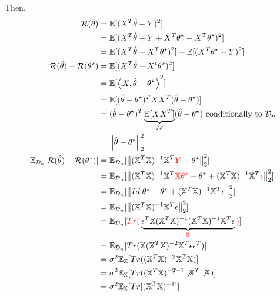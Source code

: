 Then, \begin{align*}
    \mathcal{R}(\hat{\theta }) 
        &= \mathbb{E}[(X^T \hat{\theta } - Y)^2] \\
        &= \mathbb{E}[(X^T \hat{\theta } - Y + X^T \theta ^\star - X^T \theta ^\star )^2] \\
        &= \mathbb{E}[(X^T \hat{\theta } - X^T \theta ^\star )^2] + \mathbb{E}[ (X^T \theta ^\star - Y)^2] \\
    \mathcal{R}(\hat{\theta }) - \mathcal{R}(\theta ^\star ) 
        &= \mathbb{E}[(X^T \hat{\theta } - X^t \theta ^\star )^2] \\
        &= \mathbb{E}[\left\langle X, \hat{\theta } - \theta ^\star  \right\rangle ^2 ] \\
        &= \mathbb{E}[(\hat{\theta } - \theta ^\star )^T X X^T (\hat{\theta } - \theta ^\star )] \\
        &= (\hat{\theta } - \theta ^\star )^T \underbrace{\mathbb{E}[X X^T]}_{Id}(\hat{\theta } - \theta ^\star ) \text{ conditionally to } \mathcal{D}_n \\
        &= \left\| \hat{\theta } - \theta ^\star  \right\| _2 ^2 \\
    \mathbb{E}_{\mathcal{D}_n} [ \mathcal{R}(\hat{\theta }) - \mathcal{R}(\theta ^\star )] 
        &= \mathbb{E}_{\mathcal{D}_n} [ \left\| (\mathbb{X} ^T \mathbb{X})^{-1} \mathbb{X} ^T \textcolor{red}{Y} - \theta ^\star  \right\| _2 ^2 ] \\
        &= \mathbb{E}_{\mathcal{D}_n} [ \left\| (\mathbb{X} ^T \mathbb{X})^{-1} \mathbb{X} ^T \textcolor{red}{\mathbb{X} \theta ^\star} - \theta ^\star + (\mathbb{X} ^T \mathbb{X})^{-1} \mathbb{X} ^T \textcolor{red}{\epsilon}  \right\| _2 ^2 ] \\
        &= \mathbb{E}_{\mathcal{D}_n} [ \left\| Id. \theta ^\star - \theta ^\star + (\mathbb{X} ^T \mathbb{X})^{-1} \mathbb{X} ^T \epsilon  \right\| _2 ^2 ] \\
        &= \mathbb{E}_{\mathcal{D}_n} [ \left\| (\mathbb{X} ^T \mathbb{X})^{-1} \mathbb{X} ^T \epsilon  \right\| _2 ^2 ] \\
        &= \mathbb{E}_{\mathcal{D}_n} [\textcolor{red}{Tr(} \underbrace{\epsilon ^T \mathbb{X} (\mathbb{X}^T \mathbb{X})^{-1} (\mathbb{X}^T \mathbb{X})^{-1} \mathbb{X}^T \epsilon}_{\textcolor{red}{\mathbb{R}}} \textcolor{red}{)}] \\
        &= \mathbb{E}_{\mathcal{D}_n} [Tr(\mathbb{X} (\mathbb{X}^T \mathbb{X})^{-2} \mathbb{X}^T \epsilon \epsilon ^T)] \\
        &= \sigma ^2 \mathbb{E}_\mathbb{X} [ Tr( (\mathbb{X}^T \mathbb{X})^{-2} \mathbb{X}^T \mathbb{X})] \\
        &= \sigma ^2 \mathbb{E}_\mathbb{X} [ Tr( (\mathbb{X}^T \mathbb{X})^{-\not2 -1} \not\mathbb{X}^T \not\mathbb{X})] \\
        &= \sigma ^2 \mathbb{E}_\mathbb{X} [ Tr[(\mathbb{X}^T \mathbb{X})^{-1} ] ]
\end{align*}
